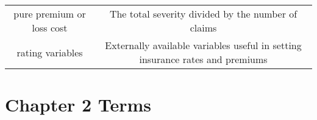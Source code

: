 \documentclass[]{book}
\theoremstyle{definition}
\theoremstyle{definition}
\theoremstyle{definition}
\theoremstyle{remark}
\begin{document}
\begin{longtable}[]{@{}cc@{}}
\begin{minipage}[t]{0.41\columnwidth}
pure premium or loss cost\strut
\end{minipage} & \begin{minipage}[t]{0.42\columnwidth}\centering\strut
The total severity divided by the number of claims\strut
\end{minipage}\tabularnewline
\begin{minipage}[t]{0.41\columnwidth}\centering\strut
rating variables\strut
\end{minipage} & \begin{minipage}[t]{0.42\columnwidth}\centering\strut
Externally available variables useful in setting insurance rates and
premiums\strut
\end{minipage}\tabularnewline
\bottomrule
\end{longtable}

\section{Chapter 2 Terms}\label{chapter-2-terms}
\end{document}
